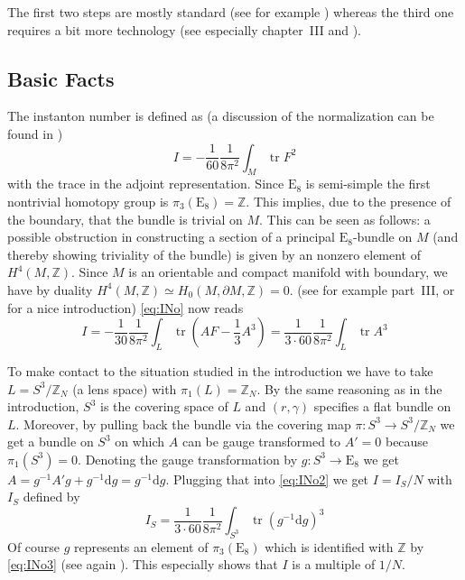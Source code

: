 \documentclass[a4paper,12pt,twoside]{article}
\numberwithin{equation}{section}
\newcommand{\pE}{\text{E}  }     %
\newcommand{\mZ}{\mathbb{Z}}
\newcommand{\Dd}{\text{d}}      %
\newcommand{\Dp}{\partial}      %
\newcommand{\auf}{\rightarrow}
\DeclareMathOperator{\tr}{tr}
\begin{document}
The first two steps are mostly standard (see for example
\cite{Spanier, Steenrod}) whereas the third one requires a bit more
technology (see especially \cite{BottTu} chapter~III and \cite{Bott}).

\subsection{Basic Facts}

The instanton number is defined as (a discussion of the normalization
can be found in \cite{Atiyah:1978wi})
\begin{equation}
  \label{eq:INo}
  I = - \frac{1}{60} \frac{1}{8\pi^2} \int_M \tr F^2
\end{equation}
with the trace in the adjoint representation. Since $\pE_8$ is
semi-simple the first nontrivial homotopy group is $\pi_3(\pE_8) =
\mZ$.  This implies, due to the presence of the boundary, that the bundle
is trivial on $M$. This can be seen as follows: a possible obstruction
in constructing a section of a principal $\pE_8$-bundle on $M$ (and
thereby showing triviality of the bundle) is given by an nonzero
element of $H^4(M,\mZ)$. Since $M$ is an orientable and compact
manifold with boundary, we have by duality $H^4 (M,\mZ) \simeq H_0 (M,
\Dp M, \mZ) = 0$. (see for example \cite{Steenrod} part~III, or
\cite{Witten:1986bt} for a nice introduction) \eqref{eq:INo} now
reads
\begin{equation}
  \label{eq:INo2}
  I = - \frac{1}{30} \frac{1}{8\pi^2} \int_L
  \tr \left( AF - \frac{1}{3} A^3 \right)
  = \frac{1}{3\cdot 60} \frac{1}{8\pi^2} \int_L \tr A^3
\end{equation}

To make contact to the situation studied in the introduction we have
to take $L = S^3/\mZ_N$ (a lens space) with $\pi_1(L) = \mZ_N$. By
the same reasoning as in the introduction, $S^3$ is the covering space
of $L$ and $(r,\gamma)$ specifies a flat bundle on $L$.  Moreover, by
pulling back the bundle via the covering map $\pi : S^3 \auf
S^3/\mZ_N$ we get a bundle on $S^3$ on which $A$ can be gauge
transformed to $A'=0$ because $\pi_1(S^3)=0$. Denoting the gauge
transformation by $g: S^3 \auf \pE_8$ we get $A = g^{-1} A' g + g^{-1}
\Dd g = g^{-1} \Dd g$.  Plugging that into \eqref{eq:INo2} we get $I =
I_S/N$ with $I_S$ defined by
\begin{equation}
  \label{eq:INo3}
  I_S = \frac{1}{3\cdot 60} \frac{1}{8\pi^2}
  \int_{S^3} \tr (g^{-1}\Dd g)^3
\end{equation}
Of course $g$ represents an element of $\pi_3(\pE_8)$ which is
identified with $\mZ$ by \eqref{eq:INo3} (see again
\cite{Atiyah:1978wi}).  This especially shows that $I$ is a multiple
of $1/N$.
\end{document}
